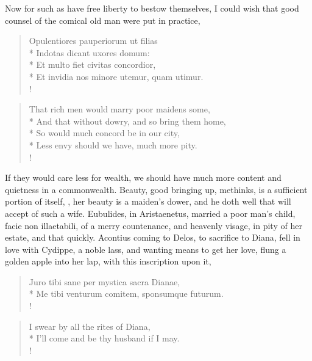 Now for such as have free liberty to bestow themselves, I could wish
that good counsel of the comical old man were put in practice,
%
\begin{latin}
\begin{verse}%
Opulentiores pauperiorum ut filias\\*
Indotas dicant uxores domum:\\*
Et multo fiet civitas concordior,\\*
Et invidia nos minore utemur, quam utimur.\\!
\end{verse}%
\end{latin}
\translationrule%
\begin{verse}%
That rich men would marry poor maidens some,\\*
And that without dowry, and so bring them home,\\*
So would much concord be in our city,\\*
Less envy should we have, much more pity.\\!
\end{verse}%
%

If they would care less for wealth, we should have much more content
and quietness in a commonwealth. Beauty, good bringing up, methinks, is
a sufficient portion of itself, , her
beauty is a maiden's dower, and he doth well that will accept of such a
wife. Eubulides, in Aristaenetus, married a poor man's child,
facie non illaetabili, of a merry countenance, and heavenly visage, in
pity of her estate, and that quickly. Acontius coming to Delos, to
sacrifice to Diana, fell in love with Cydippe, a noble lass, and
wanting means to get her love, flung a golden apple into her lap, with
this inscription upon it,
%
\begin{latin}
\begin{verse}
Juro tibi sane per mystica sacra Dianae,\\*
Me tibi venturum comitem, sponsumque futurum.\\!
\end{verse}
\end{latin}
\translationrule
\begin{verse}
I swear by all the rites of Diana,\\*
I'll come and be thy husband if I may.\\!
\end{verse}

